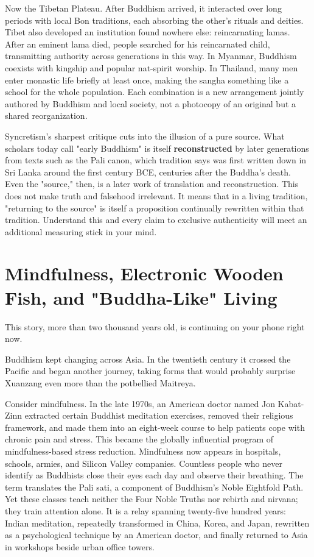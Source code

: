 Now the Tibetan Plateau. After Buddhism arrived, it interacted over long periods with local Bon traditions, each absorbing the other's rituals and deities. Tibet also developed an institution found nowhere else: reincarnating lamas. After an eminent lama died, people searched for his reincarnated child, transmitting authority across generations in this way. In Myanmar, Buddhism coexists with kingship and popular nat-spirit worship. In Thailand, many men enter monastic life briefly at least once, making the sangha something like a school for the whole population. Each combination is a new arrangement jointly authored by Buddhism and local society, not a photocopy of an original but a shared reorganization.

Syncretism's sharpest critique cuts into the illusion of a pure source. What scholars today call "early Buddhism" is itself \textbf{reconstructed} by later generations from texts such as the Pali canon, which tradition says was first written down in Sri Lanka around the first century BCE, centuries after the Buddha's death. Even the "source," then, is a later work of translation and reconstruction. This does not make truth and falsehood irrelevant. It means that in a living tradition, "returning to the source" is itself a proposition continually rewritten within that tradition. Understand this and every claim to exclusive authenticity will meet an additional measuring stick in your mind.

\section[Mindfulness and Digital Rituals]{Mindfulness, Electronic Wooden Fish, and "Buddha-Like" Living}
This story, more than two thousand years old, is continuing on your phone right now.

Buddhism kept changing across Asia. In the twentieth century it crossed the Pacific and began another journey, taking forms that would probably surprise Xuanzang even more than the potbellied Maitreya.

Consider mindfulness. In the late 1970s, an American doctor named Jon Kabat-Zinn extracted certain Buddhist meditation exercises, removed their religious framework, and made them into an eight-week course to help patients cope with chronic pain and stress. This became the globally influential program of mindfulness-based stress reduction. Mindfulness now appears in hospitals, schools, armies, and Silicon Valley companies. Countless people who never identify as Buddhists close their eyes each day and observe their breathing. The term translates the Pali sati, a component of Buddhism's Noble Eightfold Path. Yet these classes teach neither the Four Noble Truths nor rebirth and nirvana; they train attention alone. It is a relay spanning twenty-five hundred years: Indian meditation, repeatedly transformed in China, Korea, and Japan, rewritten as a psychological technique by an American doctor, and finally returned to Asia in workshops beside urban office towers.

